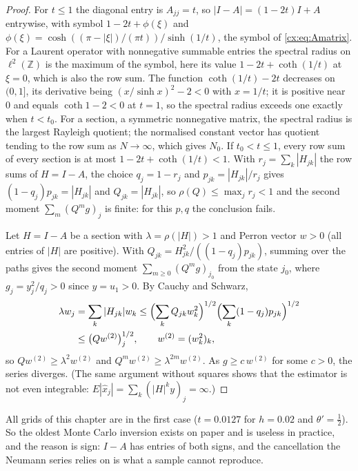 \begin{proof}
For $t\le1$ the diagonal entry is $A_{jj}=t$, so $|I-A|=(1-2t)I+A$ entrywise, with symbol $1-2t+\phi(\xi)$ and $\phi(\xi)=\cosh((\pi-|\xi|)/(\pi t))/\sinh(1/t)$, the symbol of \eqref{cx:eq:Amatrix}. For a Laurent operator with nonnegative summable entries the spectral radius on $\ell^2(\mathbb Z)$ is the maximum of the symbol, here its value $1-2t+\coth(1/t)$ at $\xi=0$, which is also the row sum. The function $\coth(1/t)-2t$ decreases on $(0,1]$, its derivative being $(x/\sinh x)^2-2<0$ with $x=1/t$; it is positive near $0$ and equals $\coth1-2<0$ at $t=1$, so the spectral radius exceeds one exactly when $t<t_0$. For a section, a symmetric nonnegative matrix, the spectral radius is the largest Rayleigh quotient; the normalised constant vector has quotient tending to the row sum as $N\to\infty$, which gives $N_0$. If $t_0<t\le1$, every row sum of every section is at most $1-2t+\coth(1/t)<1$. With $r_j=\sum_k|H_{jk}|$ the row sums of $H=I-A$, the choice $q_j=1-r_j$ and $p_{jk}=|H_{jk}|/r_j$ gives $(1-q_j)p_{jk}=|H_{jk}|$ and $Q_{jk}=|H_{jk}|$, so $\rho(Q)\le\max_jr_j<1$ and the second moment $\sum_m(Q^mg)_j$ is finite: for this $p,q$ the conclusion fails.

Let $H=I-A$ be a section with $\lambda=\rho(|H|)>1$ and Perron vector $w>0$ (all entries of $|H|$ are positive). With $Q_{jk}=H_{jk}^2/((1-q_j)p_{jk})$, summing over the paths gives the second moment $\sum_{m\ge0}(Q^mg)_{j_0}$ from the state $j_0$, where $g_j=y_j^2/q_j>0$ since $y=u_1>0$. By Cauchy and Schwarz,
\[
\begin{split}\lambda w_j&=\sum_k|H_{jk}|w_k\le\Bigl(\sum_kQ_{jk}w_k^2\Bigr)^{1/2}\Bigl(\sum_k(1-q_j)p_{jk}\Bigr)^{1/2}\\&\le\bigl(Qw^{(2)}\bigr)_j^{1/2},\qquad w^{(2)}=(w_k^2)_k,\end{split}
\]
so $Qw^{(2)}\ge\lambda^2w^{(2)}$ and $Q^mw^{(2)}\ge\lambda^{2m}w^{(2)}$. As $g\ge c\,w^{(2)}$ for some $c>0$, the series diverges. (The same argument without squares shows that the estimator is not even integrable: $E|\widehat x_j|=\sum_k(|H|^ky)_j=\infty$.)
\end{proof}

All grids of this chapter are in the first case ($t=0.0127$ for $h=0.02$ and $\theta'=\tfrac12$). So the oldest Monte Carlo inversion exists on paper and is useless in practice, and the reason is sign: $I-A$ has entries of both signs, and the cancellation the Neumann series relies on is what a sample cannot reproduce.

